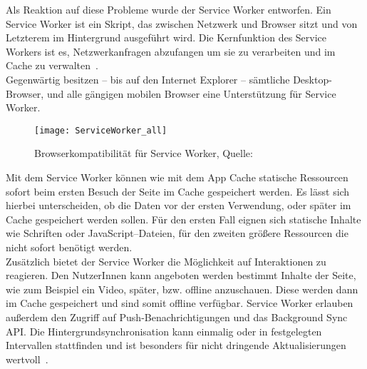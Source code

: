 Als Reaktion auf diese Probleme wurde der Service Worker entworfen.
%
%
Ein Service Worker ist ein Skript, das zwischen Netzwerk und Browser sitzt und von Letzterem im Hintergrund ausgeführt wird. Die Kernfunktion des Service Workers ist es, Netzwerkanfragen abzufangen um sie zu verarbeiten und im Cache zu verwalten~\cite{serviceworker}.\\
Gegenwärtig besitzen -- bis auf den Internet Explorer -- sämtliche Desktop-Browser, und alle gängigen mobilen Browser eine Unterstützung für Service Worker.
%
\begin{figure}[H]
	\centering
	\texttt{[image: ServiceWorker\_all]}
	\grayRule
	\caption{Browserkompatibilität für Service Worker, Quelle: ~\cite{caniuse-sw}}
	\label{fig:serviceworker}
\end{figure}
%
Mit dem Service Worker können wie mit dem App Cache statische Ressourcen sofort beim ersten Besuch der Seite im Cache gespeichert werden. Es lässt sich hierbei unterscheiden, ob die Daten vor der ersten Verwendung, oder später im Cache gespeichert werden sollen. Für den ersten Fall eignen sich statische Inhalte wie Schriften oder JavaScript--Dateien, für den zweiten größere Ressourcen die nicht sofort benötigt werden.\\
Zusätzlich bietet der Service Worker die Möglichkeit auf Interaktionen zu reagieren. Den NutzerInnen kann angeboten werden bestimmt Inhalte der Seite, wie zum Beispiel ein Video, später, bzw. offline anzuschauen. Diese werden dann im Cache gespeichert und sind somit offline verfügbar.
Service Worker erlauben außerdem den Zugriff auf Push-Benachrichtigungen und das Background Sync \gls{API}. Die Hintergrundsynchronisation kann einmalig oder in festgelegten Intervallen stattfinden und ist besonders für nicht dringende Aktualisierungen wertvoll~\cite{offline_cookbook}.